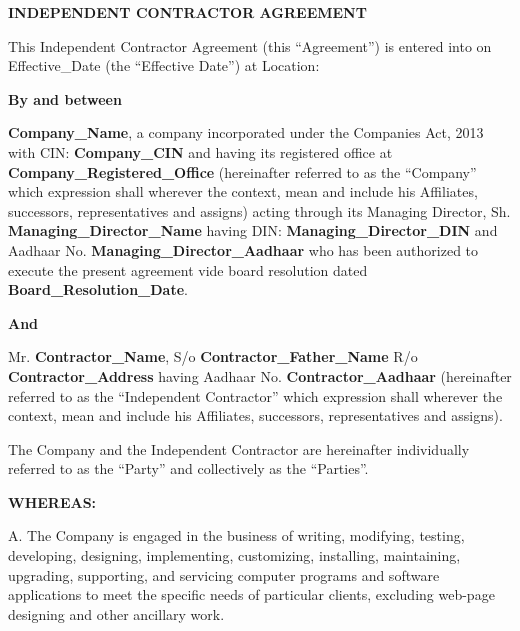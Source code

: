 \documentclass[12pt]{article}
\begin{document}
\begin{center}
    {\Large\bfseries INDEPENDENT CONTRACTOR AGREEMENT}
\end{center}

\vspace{1em}
\noindent
This Independent Contractor Agreement (this ``Agreement'') is entered into on {{Effective_Date}} (the ``Effective Date'') at {{Location}}:

\vspace{1em}
\noindent\textbf{By and between}

\vspace{0.5em}
\noindent
\textbf{{{Company_Name}}}, a company incorporated under the Companies Act, 2013 with CIN: \textbf{{{Company_CIN}}} and having its registered office at \textbf{{{Company_Registered_Office}}} (hereinafter referred to as the ``Company'' which expression shall wherever the context, mean and include his Affiliates, successors, representatives and assigns) acting through its Managing Director, Sh. \textbf{{{Managing_Director_Name}}} having DIN: \textbf{{{Managing_Director_DIN}}} and Aadhaar No. \textbf{{{Managing_Director_Aadhaar}}} who has been authorized to execute the present agreement vide board resolution dated \textbf{{{Board_Resolution_Date}}}.

\vspace{1em}
\noindent\textbf{And}

\vspace{0.5em}
\noindent
Mr. \textbf{{{Contractor_Name}}}, S/o \textbf{{{Contractor_Father_Name}}} R/o \textbf{{{Contractor_Address}}} having Aadhaar No. \textbf{{{Contractor_Aadhaar}}} (hereinafter referred to as the ``Independent Contractor'' which expression shall wherever the context, mean and include his Affiliates, successors, representatives and assigns).

\vspace{1em}
\noindent
The Company and the Independent Contractor are hereinafter individually referred to as the ``Party'' and collectively as the ``Parties''.

\vspace{1.5em}
\noindent\textbf{WHEREAS:}

\vspace{0.5em}
\noindent
A. The Company is engaged in the business of writing, modifying, testing, developing, designing, implementing, customizing, installing, maintaining, upgrading, supporting, and servicing computer programs and software applications to meet the specific needs of particular clients, excluding web-page designing and other ancillary work.
\end{document}
